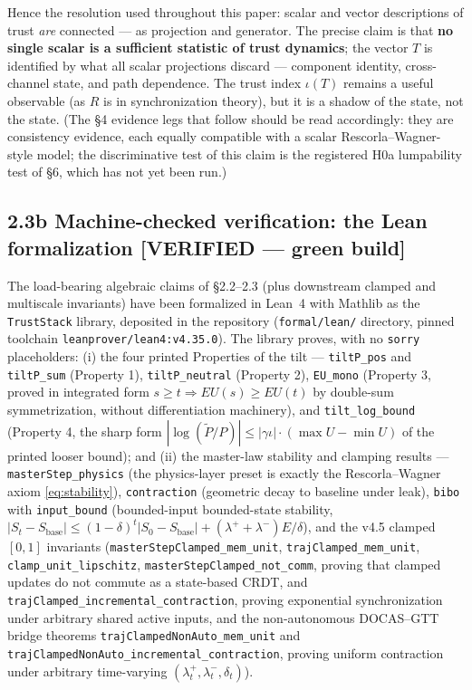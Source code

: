 \documentclass[11pt,twocolumn]{article}
\theoremstyle{gttdef}
\theoremstyle{gttplain}
\begin{document}
Hence the resolution used throughout this paper: scalar and vector descriptions of trust \emph{are} connected --- as projection and generator. The precise claim is that \textbf{no single scalar is a sufficient statistic of trust dynamics}; the vector $T$ is identified by what all scalar projections discard --- component identity, cross-channel state, and path dependence. The trust index $\iota(T)$ remains a useful observable (as $R$ is in synchronization theory), but it is a shadow of the state, not the state. (The \S{}4 evidence legs that follow should be read accordingly: they are consistency evidence, each equally compatible with a scalar Rescorla--Wagner-style model; the discriminative test of this claim is the registered H0a lumpability test of \S{}6, which has not yet been run.)

\subsection*{2.3b Machine-checked verification: the Lean formalization [VERIFIED --- green build]}

The load-bearing algebraic claims of \S{}2.2--2.3 (plus downstream clamped and multiscale invariants) have been formalized in Lean~4
\citep{demoura2021} with Mathlib \citep{mathlib2020} as the \texttt{TrustStack}
library, deposited in the repository (\texttt{formal/lean/} directory,
pinned toolchain \texttt{leanprover/lean4:v4.35.0}). The library proves, with
no \texttt{sorry} placeholders: (i) the four printed Properties of the tilt
--- \texttt{tiltP\_pos} and \texttt{tiltP\_sum} (Property 1),
\texttt{tiltP\_neutral} (Property 2), \texttt{EU\_mono} (Property 3, proved in
integrated form $s \geq t \Rightarrow EU(s) \geq EU(t)$ by double-sum
symmetrization, without differentiation machinery), and
\texttt{tilt\_log\_bound} (Property 4, the sharp form
$|\log(\tilde{P}/P)| \leq |\gamma\iota|\cdot(\max U - \min U)$ of the printed
looser bound); and (ii) the master-law stability and clamping results ---
\texttt{masterStep\_physics} (the physics-layer preset is exactly the
Rescorla--Wagner axiom \eqref{eq:stability}), \texttt{contraction}
(geometric decay to baseline under leak), \texttt{bibo} with
\texttt{input\_bound} (bounded-input bounded-state stability,
$|S_t - S_{\mathrm{base}}| \leq (1-\delta)^t|S_0 - S_{\mathrm{base}}| +
(\lambda^{+}+\lambda^{-})E/\delta$), and the v4.5 clamped $[0,1]$ invariants
(\texttt{masterStepClamped\_mem\_unit}, \texttt{trajClamped\_mem\_unit},
\texttt{clamp\_unit\_lipschitz}, \texttt{masterStepClamped\_not\_comm},
proving that clamped updates do not commute as a state-based CRDT, and
\texttt{trajClamped\_incremental\_contraction}, proving exponential
synchronization under arbitrary shared active inputs, and the non-autonomous
DOCAS--GTT bridge theorems \texttt{trajClampedNonAuto\_mem\_unit} and
\texttt{trajClampedNonAuto\_incremental\_contraction}, proving uniform
contraction under arbitrary time-varying $(\lambda^+_t, \lambda^-_t, \delta_t)$).
\end{document}
